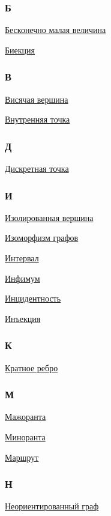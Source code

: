 \begin{multicols}{3}
\subsubsection*{Б}
\hyperlink{def:infinitesimal}{Бесконечно малая величина}

\hyperlink{def:bijection}{Биекция}

\subsubsection*{В}
\hyperlink{def:leaf_vertex}{Висячая вершина}

\hyperlink{def:interior_point}{Внутренняя точка}

\subsubsection*{Д}
\hyperlink{def:discrete_point}{Дискретная точка}

\subsubsection*{И}
\hyperlink{def:isolated_vertex}{Изолированная вершина}

\hyperlink{def:graph_isomorphism}{Изоморфизм графов}

\hyperlink{def:open_interval}{Интервал}

\hyperlink{def:infimum}{Инфимум}

\hyperlink{def:incidence}{Инцидентность}

\hyperlink{def:injection}{Инъекция}

\subsubsection*{К}
\hyperlink{def:multiple_edge}{Кратное ребро}

\subsubsection*{М}
\hyperlink{def:majorant}{Мажоранта}

\hyperlink{def:minorant}{Миноранта}

\hyperlink{def:walk}{Маршрут}

\subsubsection*{Н}
\hyperlink{def:undirected_graph}{Неориентированный граф}


\end{multicols}
